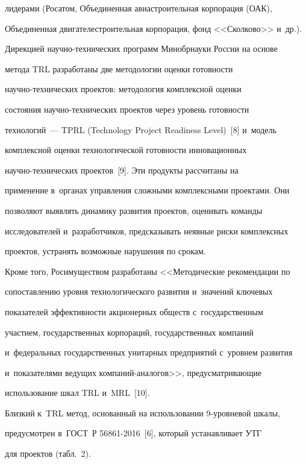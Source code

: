 лидерами (Росатом, Объединенная авиастроительная корпорация (ОАК), 

Объединенная двигателестроительная корпорация, фонд <<Сколково>> и~др.). 

Дирекцией на\-уч\-но-тех\-ни\-че\-ских программ Минобрнауки России на основе 

метода TRL разработаны две методологии оценки готовности  

на\-уч\-но-тех\-ни\-че\-ских проектов: методология комплексной оценки 

состояния на\-уч\-но-тех\-ни\-че\-ских проектов через уровень готовности 

технологий~--- TPRL (Technology Project Readiness Level)~[8] и~модель 

комплексной оценки технологической готовности инновационных  

на\-уч\-но-тех\-ни\-че\-ских проектов~[9]. Эти продукты рассчитаны на 

применение в~органах управления сложными комплексными проектами. Они 

позволяют выявлять динамику развития проектов, оценивать команды 

исследователей и~разработчиков, предсказывать неявные риски комплексных 

проектов, устранять возможные нарушения по срокам.

  

   Кроме того, Росимуществом разработаны <<Методические рекомендации по 

сопоставлению уровня технологического развития и~значений ключевых 

показателей эффективности акционерных обществ с~государственным 

участием, государственных корпораций, государственных компаний 

и~федеральных государственных унитарных предприятий с~уровнем развития 

и~показателями ведущих ком\-па\-ний-ана\-ло\-гов>>, предусматривающие 

использование шкал TRL и~MRL~[10]. 

  

  Близкий к~TRL метод, основанный на использовании 9-уров\-не\-вой шкалы, 

предусмотрен в~ГОСТ~Р 56861-2016~[6], который устанавливает УТГ

для проектов (табл.~2).



